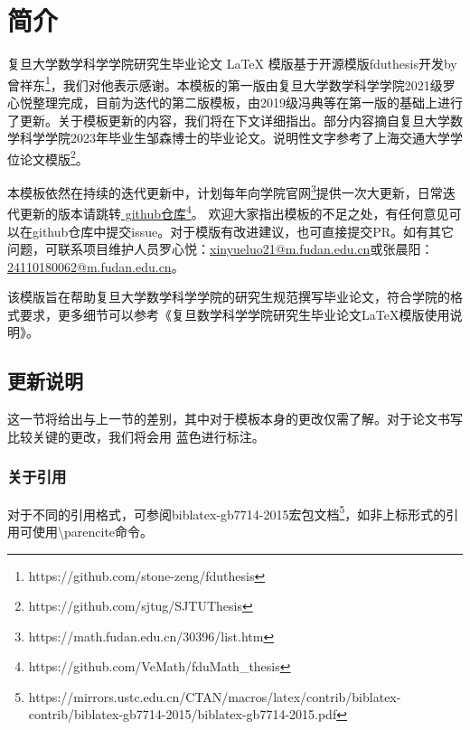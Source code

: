 \chapter{简介}
复旦大学数学科学学院研究生毕业论文 LaTeX 模版基于开源模版fduthesis开发by 曾祥东\footnote{https://github.com/stone-zeng/fduthesis}，我们对他表示感谢。本模板的第一版由复旦大学数学科学学院2021级罗心悦整理完成，目前为迭代的第二版模板，由2019级冯典等在第一版的基础上进行了更新。关于模板更新的内容，我们将在下文详细指出。部分内容摘自复旦大学数学科学学院2023年毕业生邹森博士的毕业论文。说明性文字参考了上海交通大学学位论文模版\footnote{https://github.com/sjtug/SJTUThesis}。 

本模板依然在持续的迭代更新中，计划每年向学院官网\footnote{https://math.fudan.edu.cn/30396/list.htm}提供一次大更新，日常迭代更新的版本请跳转\href{https://github.com/VeMath/fduMath_thesis}{{\color{red} github仓库}}\footnote{https://github.com/VeMath/fduMath\_thesis}。
欢迎大家指出模板的不足之处，有任何意见可以在github仓库中提交issue。对于模版有改进建议，也可直接提交PR。如有其它问题，可联系项目维护人员罗心悦：\href{mailto:xinyueluo21@m.fudan.edu.cn}{xinyueluo21@m.fudan.edu.cn}或张晨阳：\href{mailto:24110180062@m.fudan.edu.cn}{24110180062@m.fudan.edu.cn}。


该模版旨在帮助复旦大学数学科学学院的研究生规范撰写毕业论文，符合学院的格式要求，更多细节可以参考《复旦数学科学学院研究生毕业论文\LaTeX{}模版使用说明》。

\section{更新说明}
这一节将给出与上一节的差别，其中对于模板本身的更改仅需了解。对于论文书写比较关键的更改，我们将会用{\color{blue} 蓝色}进行标注。
\subsection{关于引用}
对于不同的引用格式，可参阅biblatex-gb7714-2015宏包文档\footnote{https://mirrors.ustc.edu.cn/CTAN/macros/latex/contrib/biblatex-contrib/biblatex-gb7714-2015/biblatex-gb7714-2015.pdf}，如非上标形式的引用可使用\textbackslash parencite命令。

